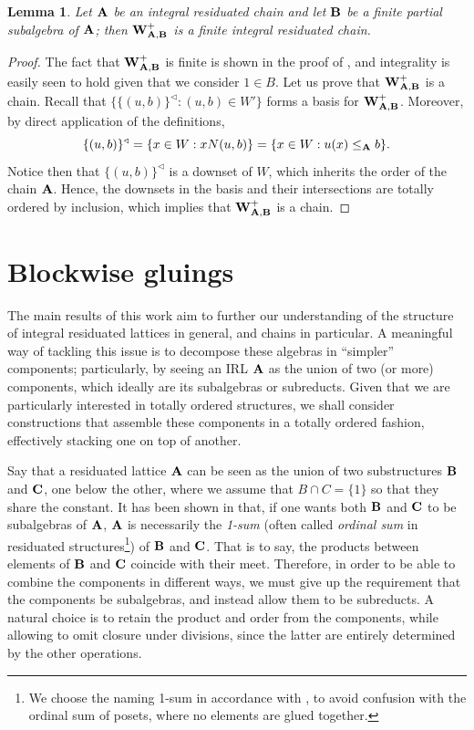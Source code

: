 \documentclass{amsart}
\newtheorem{lemma}[theorem]{Lemma}
\theoremstyle{definition}
\numberwithin{equation}{section}
\newcommand{\alg}[1]{{\textbf{\upshape #1}}}  %
\begin{document}
\begin{lemma}\label{lemma: finite chain}
	Let $\alg A$ be an integral residuated chain and let $\alg B$ be a finite partial subalgebra of $\alg A$; then $\alg {W}_{\alg A, \alg B}^+$ is a finite integral  residuated chain.
\end{lemma}
\begin{proof}
The fact that $\alg W_{\alg A, \alg B}^+$ is finite is shown in the proof of \cite[Theorem 3.18]{GalatosJipsen2013}, and integrality is easily seen to hold given that we consider $1 \in B$. Let us prove that $\alg W_{\alg A, \alg B}^+$ is a chain. Recall that $\{\{(u,b)\}^\triangleleft : (u,b) \in W' \}$ forms a basis for $\alg W_{\alg A, \alg B}^+$. Moreover, by direct application of the definitions, 
$$
\{(u,b)\}^\triangleleft= \{x \in W : x N (u,b) \}=\{x \in W : u(x) \leq_{\alg A} b \}.
$$
Notice then that $\{(u,b)\}^\triangleleft$ is a downset of $W$, which inherits the order of the chain $\alg A$. Hence, the downsets in the basis and their intersections are totally ordered by inclusion, which implies that $\alg W_{\alg A, \alg B}^+$ is a chain. 
\end{proof}


\section{Blockwise gluings}
The main results of this work aim to further our understanding of the structure of integral residuated lattices in general, and chains in particular. A meaningful way of tackling this issue is to decompose these algebras in ``simpler'' components; particularly, by seeing an IRL $\alg A$ as the union of two (or more) components, which ideally are its subalgebras or subreducts. Given that we are particularly interested in totally ordered structures, we shall consider constructions that assemble these components in a totally ordered fashion, effectively stacking one on top of another.


Say that a residuated lattice $\alg A$ can be seen as the union of two substructures $\alg B$ and $\alg C$, one below the other, where we assume that $B \cap C = \{1\}$ so that they share the constant. It has been shown in \cite[Proposition 2.1]{GalatosUgolini} that, if one wants both $\alg B$ and $\alg C$ to be subalgebras of $\alg A$, $\alg A$ is necessarily the {\em 1-sum} (often called {\em ordinal sum} in residuated structures\footnote{We choose the naming 1-sum in accordance with \cite{Olson1,Olson2}, to avoid confusion with the ordinal sum of posets, where no elements are glued together.}) of $\alg B$ and $\alg C$. That is to say, the products between elements of $\alg B$ and $\alg C$ coincide with their meet. Therefore, in order to be able to combine the components in different ways, we must give up the requirement that the components be subalgebras, and instead allow them to be subreducts. A natural choice is to retain the product and order from the components, while allowing to omit closure under divisions, since the latter are entirely determined by the other operations.
\end{document}
